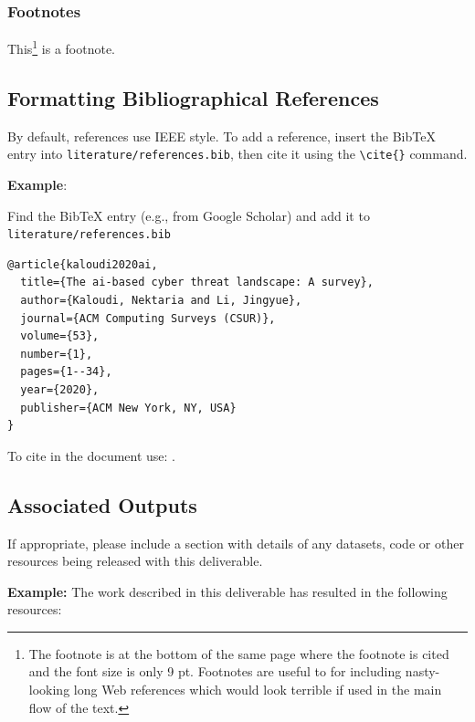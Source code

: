 \subsubsection{Footnotes}
\label{sec:footnotes}

This\footnote{The footnote is at the bottom of the same page where the footnote is cited and the font size is only 9 pt. Footnotes are useful to for including nasty-looking long Web references which would look terrible if used in the main flow of the text.} is a footnote.



\subsection{Formatting Bibliographical References}
\label{sec:formatting-bibliographical-references}


By default, references use IEEE style. To add a reference, insert the BibTeX entry into \texttt{literature/references.bib}, then cite it using the \texttt{\textbackslash cite\{\}} command.


\textbf{Example}: 

Find the BibTeX entry (e.g., from Google Scholar) and add it to \texttt{literature/references.bib}

\begin{verbatim}
@article{kaloudi2020ai,
  title={The ai-based cyber threat landscape: A survey},
  author={Kaloudi, Nektaria and Li, Jingyue},
  journal={ACM Computing Surveys (CSUR)},
  volume={53},
  number={1},
  pages={1--34},
  year={2020},
  publisher={ACM New York, NY, USA}
}
\end{verbatim}

To cite in the document use: \cite{kaloudi2020ai}.




\subsection{Associated Outputs}
\label{sec:associated-outputs}

If appropriate, please include a section with details of any datasets, code or other resources being released with this deliverable.

\textbf{Example:}
The work described in this deliverable has resulted in the following resources:

